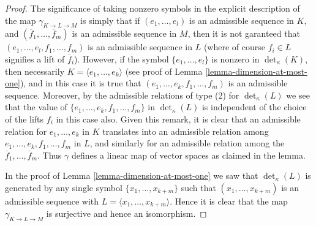 \begin{proof}
The significance of taking nonzero symbols in the explicit description
of the map $\gamma_{K \to L \to M}$ is simply that if $(e_1, \ldots, e_l)$
is an admissible sequence in $K$, and
$(\overline{f}_1, \ldots, \overline{f}_m)$ is an admissible sequence in
$M$, then it is not garanteed that $(e_1, \ldots, e_l, f_1, \ldots, f_m)$
is an admissible sequence in $L$ (where of course $f_i \in L$ signifies
a lift of $\overline{f}_i$). However, if the symbol
$\{e_1, \ldots, e_l\}$ is nonzero in $\det_\kappa(K)$, then
necessarily $K = \langle e_1, \ldots, e_k\rangle$ (see
proof of Lemma \ref{lemma-dimension-at-most-one}), and
in this case it is true that $(e_1, \ldots, e_k, f_1, \ldots, f_m)$
is an admissible sequence.
Moreover, by the admissible relations of type (2) for $\det_\kappa(L)$
we see that the value of $\{e_1, \ldots, e_k, f_1, \ldots, f_m\}$ in
$\det_\kappa(L)$ is independent of the choice of the lifts
$f_i$ in this case also. Given this remark, it is clear
that an admissible relation for $e_1, \ldots, e_k$ in $K$
translates into an admissible relation among
$e_1, \ldots, e_k, f_1, \ldots, f_m$ in $L$, and
similarly for an admissible relation among the
$\overline{f}_1, \ldots, \overline{f}_m$.
Thus $\gamma$ defines a linear map of vector spaces as claimed in the lemma.

\medskip\noindent
In the proof of
Lemma \ref{lemma-dimension-at-most-one} we saw that
$\det_\kappa(L)$ is generated by any single
symbol $\{x_1, \ldots, x_{k + m}\}$ such that
$(x_1, \ldots, x_{k + m})$ is an admissible sequence
with $L = \langle x_1, \ldots, x_{k + m}\rangle$. Hence it is
clear that the map $\gamma_{K \to L \to M}$ is surjective and
hence an isomorphism.


\end{proof}
